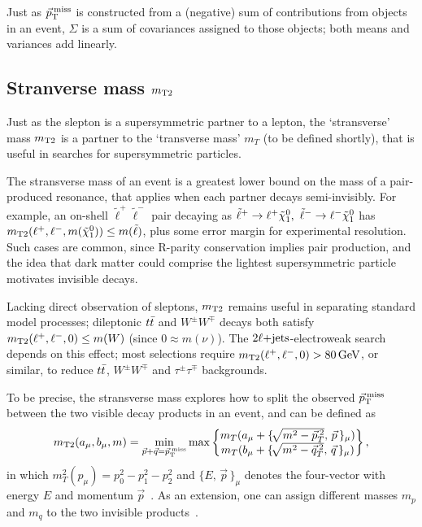 Just as $\ptmiss$ is constructed from a (negative) sum of contributions from
objects in an event,
$\Sigma$ is a sum of covariances assigned to those objects;
both means and variances add linearly.


\subsection{Stranverse mass \texorpdfstring{$\mttwo$}{mT2}}
\label{sec:2ljets_mt2}
Just as the slepton is a supersymmetric partner to a lepton, the `stransverse'
mass $\mttwo$ is a partner to the `transverse mass' $m_T$
(to be defined shortly),
that is useful in searches for supersymmetric particles.

The stransverse mass of an event is a greatest lower bound on the mass of a
pair-produced resonance, that applies when each partner decays semi-invisibly.
For example, an on-shell $\tilde\ell^+\tilde\ell^-$ pair decaying as
$\tilde\ell^+ \rightarrow \ell^+ \neutralino_1
,~
\tilde\ell^- \rightarrow \ell^- \neutralino_1$ has
$\mttwo(\ell^+, \ell^-, m(\neutralino_1)) \leq m(\tilde\ell)$, plus some error
margin for experimental resolution.
Such cases are common, since R-parity conservation implies pair production,
and the idea that dark matter could comprise the lightest supersymmetric
particle motivates invisible decays.

Lacking direct observation of sleptons, $\mttwo$ remains useful in separating
standard model processes; dileptonic $\ttbar$ and $W^\pm W^\mp$ decays both
satisfy $\mttwo(\ell^+, \ell^-, 0) \leq m(W)$ (since $0 \approx m(\nu)$).
The $\twoljets$-electroweak search depends on this effect;
most selections require $\mttwo(\ell^+, \ell^-, 0) > 80\,\eV[G]$, or similar,
to reduce $\ttbar$, $W^\pm W^\mp$ and $\tau^\pm\tau^\mp$ backgrounds.

To be precise, the stransverse mass explores how to split the observed
$\ptmiss$ between the two visible decay products in an event, and can be
defined as
\begin{equation}
\mttwo(a_\mu, b_\mu, m)
=
\min_{\vec p + \vec q=\ptmiss}
\max
\begin{Bmatrix}
m_T(a_\mu + \{\!\sqrt{m^2 - \vec p_T^{\:2}},\,\vec p\,\}_\mu)\\
m_T(b_\mu + \{\!\sqrt{m^2 - \vec q_T^{\:2}},\,\vec q\,\}_\mu)\\
\end{Bmatrix}
,
\end{equation}
in which $m_T^2(p_\mu) = p_0^2 - p_1^2 - p_2^2$ and $\{E,\,\vec p\,\}_\mu$ denotes
the four-vector with energy $E$ and momentum $\vec p$~\cite{lester1999measuring}.
As an extension, one can assign different masses $m_p$ and $m_q$ to
the two invisible products~\cite{lester2015bisection}.

